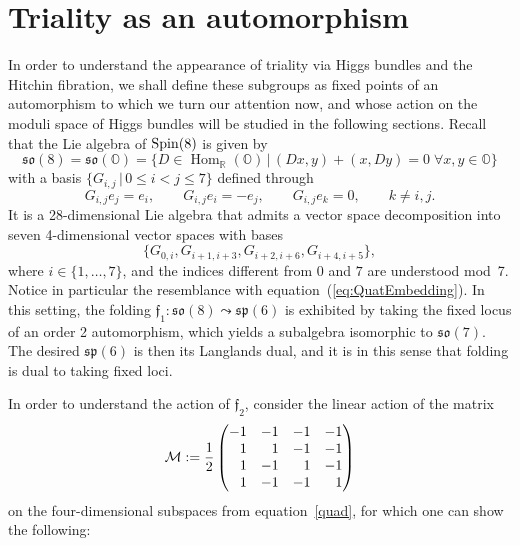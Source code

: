 \documentclass[pdftex]{sigma}
\numberwithin{equation}{section}
\newcommand{\Hom}{\operatorname{Hom}}
\newcommand{\Oct}{{\mathbb O}}
\begin{document}
\section{Triality as an automorphism}\label{sec:action}
In order to understand the appearance of triality via Higgs bundles and the Hitchin fibration, we shall define these subgroups as fixed points of an automorphism to which we turn our attention now, and whose action on the moduli space of Higgs bundles will be studied in the following sections. Recall that the Lie algebra of ${\rm Spin}(8)$ is given by
\begin{equation*}
\mathfrak{so}(8) = \mathfrak{so}(\Oct) = \{ D \in \Hom_\mathbb{R}(\Oct) \, | \, (Dx,y) + (x,Dy) = 0 \; \forall x,y \in \Oct \}
\end{equation*}
with a basis $\{ G_{i,j} \, | \, 0 \leq i < j \leq 7 \}$ defined through
\begin{equation*}
G_{i,j} e_j = e_i, \qquad G_{i,j} e_i = -e_j, \qquad G_{i,j} e_k = 0, \qquad k \neq i,j.
\end{equation*}
It is a 28-dimensional Lie algebra that admits a vector space decomposition into seven 4-dimensional vector spaces with bases
\begin{equation}
\{G_{0,i} , G_{i+1,i+3}, G_{i+2,i+6} , G_{i+4,i+5} \},\label{quad}
\end{equation}
where $i \in \{1, \dots , 7 \}$, and the indices different from $0$ and $7$ are understood mod~7. Notice in particular the resemblance with equation~(\ref{eq:QuatEmbedding}). In this setting, the folding $\mathfrak{f}_1\colon \mathfrak{so}(8) \leadsto \mathfrak{sp}(6)$ is exhibited by taking the fixed locus of an order 2 automorphism, which yields a subalgebra isomorphic to $\mathfrak{so}(7)$. The desired $\mathfrak{sp}(6)$ is then its Langlands dual, and it is in this sense that folding is dual to taking fixed loci.

In order to understand the action of $\mathfrak{f}_2$, consider the linear action of the matrix
\begin{equation}\label{eq:TrafoMatrix}
 \mathcal{M} := \frac{1}{2} \begin{pmatrix}
-1 & -1 & -1 & -1 \\
\hphantom{-}1 & \hphantom{-}1 & -1 & -1 \\
\hphantom{-}1 & -1 & \hphantom{-}1 & -1 \\
\hphantom{-}1 & -1 & -1 & \hphantom{-}1
\end{pmatrix}
\end{equation}
on the four-dimensional subspaces from equation~\eqref{quad}, for which one can show the following:
\end{document}
